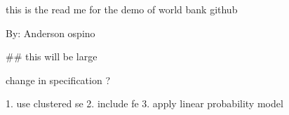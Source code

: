 this is the read me for the demo of world bank github

By: Anderson ospino

## this will be large



change in specification ?

1. use clustered se
2. include fe
3. apply linear probability model

